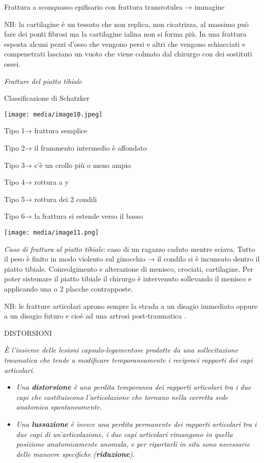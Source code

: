 \documentclass[]{article}
\begin{document}
Frattura a sconquasso epifisario con frattura transrotulea → immagine

NB: la cartilagine è un tessuto che non replica, non cicatrizza, al
massimo può fare dei ponti fibrosi ma la cartilagine ialina non si forma
più. In una frattura esposta alcuni pezzi d'osso che vengono persi e
altri che vengono schiacciati e compenetrati lasciano un vuoto che viene
colmato dal chirurgo con dei sostituti ossei.

\emph{Fratture del piatto tibiale}

Classificazione di Schatzker

\texttt{[image: media/image10.jpeg]}

Tipo 1→ frattura semplice

Tipo 2→ il frammento intermedio è affondato

Tipo 3→ c'è un crollo più o meno ampio

Tipo 4→ rottura a y

Tipo 5→ rottura dei 2 condili

Tipo 6→ la frattura si estende verso il basso

\texttt{[image: media/image11.png]}

\emph{Caso di frattura al piatto tibiale}: caso di un ragazzo caduto
mentre sciava. Tutto il peso è finito in modo violento sul ginocchio →
il condilo si è incuneato dentro il piatto tibiale. Coinvolgimento e
alterazione di menisco, crociati, cartilagine. Per poter sistemare il
piatto tibiale il chirurgo è intervenuto sollevando il menisco e
applicando una o 2 placche contrapposte.

NB: le fratture articolari aprono sempre la strada a un disagio
immediato oppure a un disagio futuro e cioè ad una artrosi
post-traumatica .

DISTORSIONI

\emph{È l'insieme delle lesioni capsulo-legamentose prodotte da una
sollecitazione traumatica che tende a modificare temporaneamente i
reciproci rapporti dei capi articolari}.

\begin{itemize}
\item
  \emph{Una \textbf{distorsione} è una perdita temporanea dei rapporti
  articolari tra i due capi che costituiscono l'articolazione che
  tornano nella corretta sede anatomica spontaneamente.}
\item
  \emph{Una \textbf{lussazione} è invece una perdita permanente dei
  rapporti articolari tra i due capi di un'articolazione, i due capi
  articolari rimangono in quella posizione anatomicamente anomala, e per
  riportarli in situ sono necessarie delle manovre specifiche
  (\textbf{riduzione}).}
\end{itemize}
\end{document}
